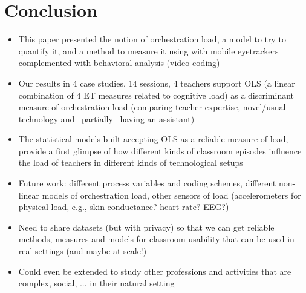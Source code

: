 \documentclass[10pt,journal,compsoc]{IEEEtran}
\begin{document}
\section{Conclusion}
\label{sec:conclusion}
\begin{itemize}
\item This paper presented the notion of orchestration load, a model to try to quantify it, and a method to measure it using with mobile eyetrackers complemented with behavioral analysis (video coding)
\item Our results in 4 case studies, 14 sessions, 4 teachers support OLS (a linear combination of 4 ET measures related to cognitive load) as a discriminant measure of orchestration load (comparing teacher expertise, novel/usual technology and --partially-- having an assistant)
\item The statistical models built accepting OLS as a reliable measure of load, provide a first glimpse of how different kinds of classroom episodes influence the load of teachers in different kinds of technological setups
\item Future work: different process variables and coding schemes, different non-linear models of orchestration load, other sensors of load (accelerometers for physical load, e.g., skin conductance? heart rate? EEG?)
\item Need to share datasets (but with privacy) so that we can get reliable methods, measures and models for classroom usability that can be used in real settings (and maybe at scale!)
\item Could even be extended to study other professions and activities that are complex, social, ... in their natural setting
\end{itemize}





%
\end{document}
